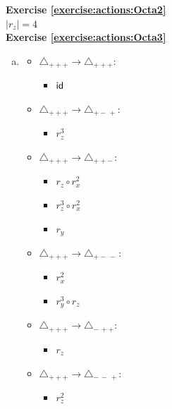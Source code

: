 \noindent\textbf{Exercise \ref{exercise:actions:Octa2}}
\\
$|r_z|=4$
\\

\noindent\textbf{Exercise \ref{exercise:actions:Octa3}}
\begin{enumerate}[(a)]
\item
	\begin{multicols}{2}
	\begin{itemize}
	\item
	$\triangle_{ +++} \rightarrow \triangle_{ +++}:$
		\begin{itemize}
		\item
		$\sf{id}$
		\end{itemize}
		
	\item
	$\triangle_{ +++} \rightarrow \triangle_{ +-\,+}: $
		\begin{itemize}
		\item
		$r_z^3$
		\end{itemize}
	
	\item
	$\triangle_{ +++} \rightarrow \triangle_{ ++-\,}:$
		\begin{itemize}
		\item
		$r_z \circ r_x^2$
		
		\item
		$r_z^3 \circ r_x^2$
		
		\item
		$r_y$
		\end{itemize}
	
	\item
	$\triangle_{ +++} \rightarrow \triangle_{ +-\,-\,}: $
		\begin{itemize}
		\item
		$r_x^2$
		
		\item
		$r_y^3 \circ r_z$
		\end{itemize}
		
	\item
	$\triangle_{ +++} \rightarrow \triangle_{-\,++}:$ 
		\begin{itemize}
		\item
		$r_z $
		\end{itemize}
		
	\item
	$\triangle_{ +++} \rightarrow \triangle_{-\,-\,+}:$ 
		\begin{itemize}
		\item
		$r_z^2$
		\end{itemize}
		

\end{itemize}
\end{multicols}
\end{enumerate}
